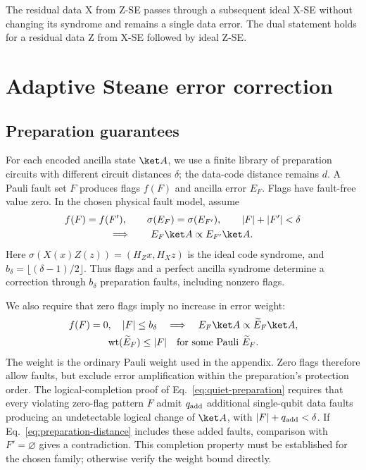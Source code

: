 \documentclass[11pt,a4paper]{article}
\theoremstyle{definition}
\begin{document}
The residual data X from Z-SE passes through a subsequent ideal X-SE
without changing its syndrome and remains a single data error. The dual
statement holds for a residual data Z from X-SE followed by ideal Z-SE.

\section{Adaptive Steane error correction}
\label{sec:adaptive}

\subsection{Preparation guarantees}
\label{sec:preparation-guarantees}

For each encoded ancilla state $\ket A$, we use a finite library of
preparation circuits with different circuit distances $\delta$; the
data-code distance remains $d$.
A Pauli fault set $F$ produces flags $f(F)$ and ancilla error $E_F$.
Flags have fault-free value zero.
In the chosen physical fault model, assume
\begin{equation}
    \begin{gathered}
        f(F)=f(F'),\qquad \sigma(E_F)=\sigma(E_{F'}),\qquad
        |F|+|F'|<\delta \\
        \Longrightarrow\qquad
        E_F\ket A\propto E_{F'}\ket A.
    \end{gathered}
    \label{eq:preparation-distance}
\end{equation}
Here $\sigma(X(x)Z(z))=(H_Zx,H_Xz)$ is the ideal code syndrome, and
$b_\delta=\lfloor(\delta-1)/2\rfloor$. Thus flags and a perfect
ancilla syndrome determine a correction through $b_\delta$ preparation
faults, including nonzero flags.

We also require that zero flags imply no increase in error weight:
\begin{equation}
    \begin{gathered}
        f(F)=0,\quad |F|\leq b_\delta
        \quad\Longrightarrow\quad
        E_F\ket A\propto\widetilde E_F\ket A,\\
        \operatorname{wt}(\widetilde E_F)\leq |F|
        \quad\text{for some Pauli }\widetilde E_F.
    \end{gathered}
    \label{eq:quiet-preparation}
\end{equation}
The weight is the ordinary Pauli weight used in the appendix. Zero flags
therefore allow faults, but exclude error amplification within the
preparation's protection order.
The logical-completion proof of Eq.~\eqref{eq:quiet-preparation} requires
that every violating zero-flag pattern $F$ admit $q_{\rm add}$ additional
single-qubit data faults producing an undetectable logical change of
$\ket A$, with $|F|+q_{\rm add}<\delta$. If
Eq.~\eqref{eq:preparation-distance} includes these added faults, comparison
with $F'=\varnothing$ gives a contradiction. This completion property
must be established for the chosen family; otherwise verify the weight
bound directly.
\end{document}
